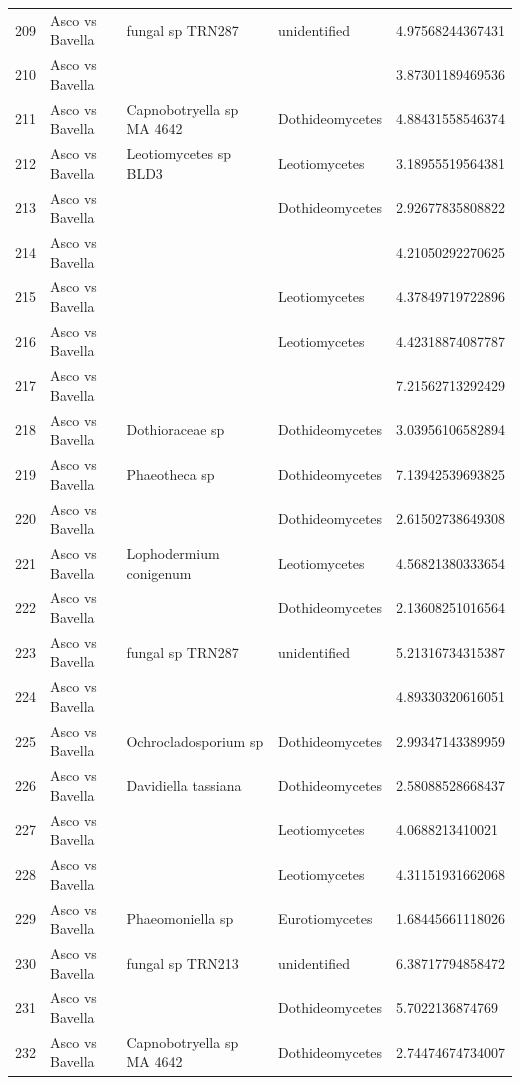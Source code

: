 \documentclass[12pt]{article}\usepackage[]{graphicx}\usepackage[]{color}
\numberwithin{figure}{section}
\begin{document}
\begin{table}[ht]
\begin{tabular}{lllll}
  209 & Asco vs Bavella & fungal sp TRN287 & unidentified & 4.97568244367431 \\ 
  210 & Asco vs Bavella &  &  & 3.87301189469536 \\ 
  211 & Asco vs Bavella & Capnobotryella sp MA 4642 & Dothideomycetes & 4.88431558546374 \\ 
  212 & Asco vs Bavella & Leotiomycetes sp BLD3 & Leotiomycetes & 3.18955519564381 \\ 
  213 & Asco vs Bavella &  & Dothideomycetes & 2.92677835808822 \\ 
  214 & Asco vs Bavella &  &  & 4.21050292270625 \\ 
  215 & Asco vs Bavella &  & Leotiomycetes & 4.37849719722896 \\ 
  216 & Asco vs Bavella &  & Leotiomycetes & 4.42318874087787 \\ 
  217 & Asco vs Bavella &  &  & 7.21562713292429 \\ 
  218 & Asco vs Bavella & Dothioraceae sp & Dothideomycetes & 3.03956106582894 \\ 
  219 & Asco vs Bavella & Phaeotheca sp & Dothideomycetes & 7.13942539693825 \\ 
  220 & Asco vs Bavella &  & Dothideomycetes & 2.61502738649308 \\ 
  221 & Asco vs Bavella & Lophodermium conigenum & Leotiomycetes & 4.56821380333654 \\ 
  222 & Asco vs Bavella &  & Dothideomycetes & 2.13608251016564 \\ 
  223 & Asco vs Bavella & fungal sp TRN287 & unidentified & 5.21316734315387 \\ 
  224 & Asco vs Bavella &  &  & 4.89330320616051 \\ 
  225 & Asco vs Bavella & Ochrocladosporium sp & Dothideomycetes & 2.99347143389959 \\ 
  226 & Asco vs Bavella & Davidiella tassiana & Dothideomycetes & 2.58088528668437 \\ 
  227 & Asco vs Bavella &  & Leotiomycetes & 4.0688213410021 \\ 
  228 & Asco vs Bavella &  & Leotiomycetes & 4.31151931662068 \\ 
  229 & Asco vs Bavella & Phaeomoniella sp & Eurotiomycetes & 1.68445661118026 \\ 
  230 & Asco vs Bavella & fungal sp TRN213 & unidentified & 6.38717794858472 \\ 
  231 & Asco vs Bavella &  & Dothideomycetes & 5.7022136874769 \\ 
  232 & Asco vs Bavella & Capnobotryella sp MA 4642 & Dothideomycetes & 2.74474674734007 \\ 

\end{tabular}
\end{table}
\end{document}
